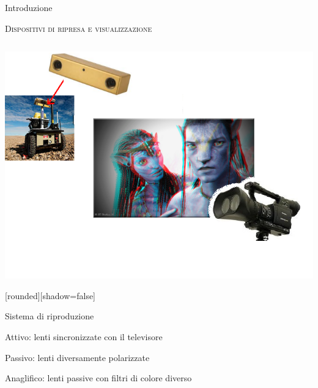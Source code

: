 \documentclass{beamer}
\begin{document}
\begin{section}{Introduzione}
\begin{frame}[t]{\textsc{Dispositivi di ripresa e visualizzazione}}
\begin{columns}
\begin{column}{5cm}

\centering
\vspace{0.7em}
\includegraphics[width=1\linewidth]{./img/camere.png}
\vspace{-2.8em}
\begin{center}
[rounded][shadow=false]
\begin{block}{Sistema di riproduzione}
		\begin{itemize}
			\item  \small{Attivo: lenti sincronizzate con il televisore
			\item Passivo: lenti diversamente polarizzate
			\item Anaglifico: lenti passive con filtri di colore diverso}
		\end{itemize}	
	\end{block}
\end{center}
\end{column}
\end{columns}
\end{frame}


\end{section}
\end{document}

